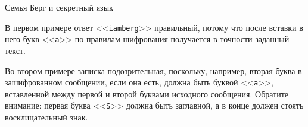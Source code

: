 \begin{problem}{Семья Берг и секретный язык}
\Examples

\begin{example}
%
%
\end{example}

\Explanations

В первом примере ответ <<\texttt{iamberg}>> правильный,
потому что после вставки в него букв <<\texttt{a}>> по правилам шифрования
получается в точности заданный текст.

Во втором примере записка подозрительная, поскольку, например,
вторая буква в зашифрованном сообщении, если она есть, должна быть буквой
<<\texttt{a}>>, вставленной между первой и второй буквами исходного сообщения.
Обратите внимание: первая буква <<\texttt{S}>> должна быть
заглавной, а в конце должен стоять восклицательный знак.

\end{problem}
